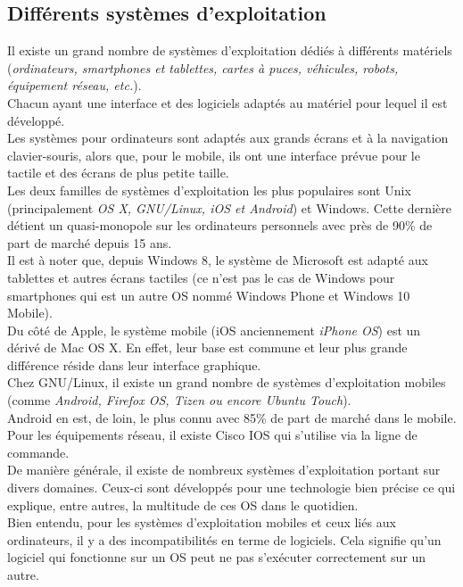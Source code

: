 \newpage

\subsection{Différents systèmes d'exploitation}
Il existe un grand nombre de systèmes d’exploitation dédiés à différents
matériels (\textit{ordinateurs, smartphones et tablettes, cartes à puces,
véhicules, robots, équipement réseau, etc.}). \\

Chacun ayant une interface et des logiciels adaptés au matériel pour lequel il
est développé. \\ Les systèmes pour ordinateurs sont adaptés aux grands écrans
et à la navigation clavier-souris, alors que, pour le mobile, ils ont une
interface prévue pour le tactile et des écrans de plus petite taille. \\

Les deux familles de systèmes d'exploitation les plus populaires sont Unix
(principalement \textit{OS X, GNU/Linux, iOS et Android}) et Windows. Cette
dernière détient un quasi-monopole sur les ordinateurs personnels avec près de
90\% de part de marché depuis 15 ans. \\

Il est à noter que, depuis Windows 8, le système de Microsoft est adapté aux
tablettes et autres écrans tactiles (ce n’est pas le cas de Windows pour
smartphones qui est un autre OS nommé Windows Phone et Windows 10 Mobile). \\

Du côté de Apple, le système mobile (iOS anciennement \textit{iPhone OS}) est
un dérivé de Mac OS X. En effet, leur base est commune et leur plus grande
différence réside dans leur interface graphique. \\

Chez GNU/Linux, il existe un grand nombre de systèmes d’exploitation mobiles
(comme \textit{Android, Firefox OS, Tizen ou encore Ubuntu Touch}). \\
Android en est, de loin, le plus connu avec 85\% de part de marché dans le
mobile. \\

Pour les équipements réseau, il existe Cisco IOS qui s'utilise via la ligne
de commande. \\

De manière générale, il existe de nombreux systèmes d'exploitation portant
sur divers domaines. Ceux-ci sont développés pour une technologie bien précise
ce qui explique, entre autres, la multitude de ces OS dans le quotidien. \\
Bien entendu, pour les systèmes d'exploitation mobiles et ceux liés aux
ordinateurs, il y a des incompatibilités en terme de logiciels. Cela signifie
qu'un logiciel qui fonctionne sur un OS peut ne pas s'exécuter correctement sur
un autre.

